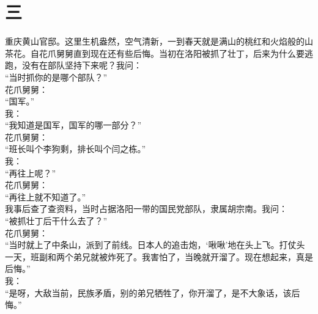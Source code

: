 \fancyhead[RO]{\thepage} %
\fancyhead[LE]{\thepage} %
\fancyfoot[LE,RO]{}
\fancyfoot[LO,CE]{}
\fancyfoot[CO,RE]{}
\chapter*{三}
重庆黄山官邸。这里生机盎然，空气清新，一到春天就是满山的桃红和火焰般的山茶花。自花爪舅舅直到现在还有些后悔。当初在洛阳被抓了壮丁，后来为什么要逃跑，没有在部队坚持下来呢？我问：\\

“当时抓你的是哪个部队？”\\

花爪舅舅：\\

“国军。”\\

我：\\

“我知道是国军，国军的哪一部分？”\\

花爪舅舅：\\

“班长叫个李狗剩，排长叫个闫之栋。”\\

我：\\

“再往上呢？”\\

花爪舅舅：\\

“再往上就不知道了。”\\

我事后查了查资料，当时占据洛阳一带的国民党部队，隶属胡宗南。我问：\\

“被抓壮丁后干什么去了？”\\

花爪舅舅：\\

“当时就上了中条山，派到了前线。日本人的追击炮，‘啾啾’地在头上飞。打仗头一天，班副和两个弟兄就被炸死了。我害怕了，当晚就开溜了。现在想起来，真是后悔。”\\

我：\\

“是呀，大敌当前，民族矛盾，别的弟兄牺牲了，你开溜了，是不大象话，该后悔。”\\

